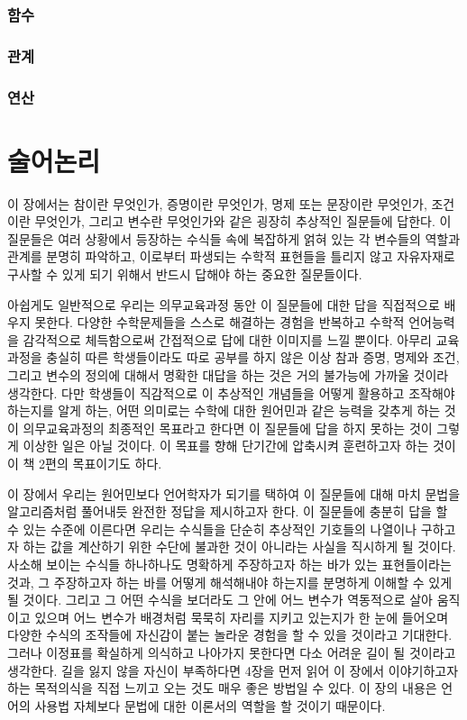 \documentclass{../../large}
\begin{document}
\subsection*{함수}
\subsection*{관계}
\subsection*{연산}









\chapter{술어논리}

이 장에서는 참이란 무엇인가, 증명이란 무엇인가, 명제 또는 문장이란 무엇인가, 조건이란 무엇인가, 그리고 변수란 무엇인가와 같은 굉장히 추상적인 질문들에 답한다.
이 질문들은 여러 상황에서 등장하는 수식들 속에 복잡하게 얽혀 있는 각 변수들의 역할과 관계를 분명히 파악하고, 이로부터 파생되는 수학적 표현들을 틀리지 않고 자유자재로 구사할 수 있게 되기 위해서 반드시 답해야 하는 중요한 질문들이다.

아쉽게도 일반적으로 우리는 의무교육과정 동안 이 질문들에 대한 답을 직접적으로 배우지 못한다.
다양한 수학문제들을 스스로 해결하는 경험을 반복하고 수학적 언어능력을 감각적으로 체득함으로써 간접적으로 답에 대한 이미지를 느낄 뿐이다.
아무리 교육과정을 충실히 따른 학생들이라도 따로 공부를 하지 않은 이상 참과 증명, 명제와 조건, 그리고 변수의 정의에 대해서 명확한 대답을 하는 것은 거의 불가능에 가까울 것이라 생각한다.
다만 학생들이 직감적으로 이 추상적인 개념들을 어떻게 활용하고 조작해야 하는지를 알게 하는, 어떤 의미로는 수학에 대한 원어민과 같은 능력을 갖추게 하는 것이 의무교육과정의 최종적인 목표라고 한다면 이 질문들에 답을 하지 못하는 것이 그렇게 이상한 일은 아닐 것이다.
이 목표를 향해 단기간에 압축시켜 훈련하고자 하는 것이 이 책 2편의 목표이기도 하다.

이 장에서 우리는 원어민보다 언어학자가 되기를 택하여 이 질문들에 대해 마치 문법을 알고리즘처럼 풀어내듯 완전한 정답을 제시하고자 한다.
이 질문들에 충분히 답을 할 수 있는 수준에 이른다면 우리는 수식들을 단순히 추상적인 기호들의 나열이나 구하고자 하는 값을 계산하기 위한 수단에 불과한 것이 아니라는 사실을 직시하게 될 것이다.
사소해 보이는 수식들 하나하나도 명확하게 주장하고자 하는 바가 있는 표현들이라는 것과, 그 주장하고자 하는 바를 어떻게 해석해내야 하는지를 분명하게 이해할 수 있게 될 것이다.
그리고 그 어떤 수식을 보더라도 그 안에 어느 변수가 역동적으로 살아 움직이고 있으며 어느 변수가 배경처럼 묵묵히 자리를 지키고 있는지가 한 눈에 들어오며 다양한 수식의 조작들에 자신감이 붙는 놀라운 경험을 할 수 있을 것이라고 기대한다.
그러나 이정표를 확실하게 의식하고 나아가지 못한다면 다소 어려운 길이 될 것이라고 생각한다.
길을 잃지 않을 자신이 부족하다면 4장을 먼저 읽어 이 장에서 이야기하고자 하는 목적의식을 직접 느끼고 오는 것도 매우 좋은 방법일 수 있다.
이 장의 내용은 언어의 사용법 자체보다 문법에 대한 이론서의 역할을 할 것이기 때문이다.
\end{document}
